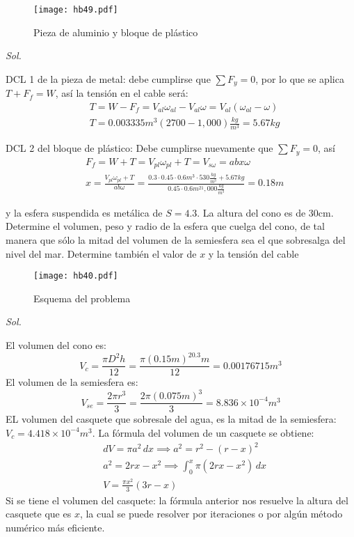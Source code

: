 \begin{figure}[h!]
\centering
  \texttt{[image: hb49.pdf]}
  \caption{Pieza de aluminio y bloque de plástico}
  \label{hb49}
\end{figure}

\textit{ Sol. }

DCL 1 de la pieza de metal: debe cumplirse que $\sum F_y=0$, por lo que se aplica $T+F_f=W$, así la tensión en el cable será:
\begin{align*}
    &T=W-F_f=V_{al}\omega_{al}-V_{al}\omega=V_{al}\left(\omega_{al}-\omega\right)\\
    &T=0.003335m^3\left(2700-1,000\right)\frac{kg}{m^3}=5.67kg
\end{align*}

DCL 2 del bloque de plástico: Debe cumplirse nuevamente que $\sum F_y=0$, así 
\begin{align*}
    &F_f=W+T=V_{pl}\omega_{pl}+T=V_{s\omega}=abx\omega\\
    &x=\frac{V_{pl}\omega_{pl}+T}{ab\omega}=\frac{0.3\cdot 0.45\cdot 0.6m^3\cdot 530\frac{kg}{m^3}+5.67kg}{0.45\cdot 0.6m^21,000\frac{kg}{m^3}}=0.18m
\end{align*}

\begin{problem}[La boya de plástico (s=0.62)]
    y la esfera suspendida es metálica de $S=4.3$. La altura del cono es de 30cm. Determine el volumen, peso y radio de la esfera que cuelga del cono, de tal manera que sólo la mitad del volumen de la semiesfera sea el que sobresalga del nivel del mar. Determine también el valor de $x$ y la tensión del cable
\end{problem}

\begin{figure}[h!]
\centering
  \texttt{[image: hb40.pdf]}
  \caption{Esquema del problema}
  \label{hb40}
\end{figure}

\textit{ Sol. }

El volumen del cono es:
\begin{equation*}
    V_c=\frac{\pi D^2h}{12}=\frac{\pi(0.15m)^20.3m}{12}=0.00176715m^3
\end{equation*}
El volumen de la semiesfera es: 
\begin{equation*}
    V_{se}=\frac{2\pi r^3}{3}=\frac{2\pi(0.075m)^3}{3}=8.836\times 10^{-4}m^3
\end{equation*}
EL volumen del casquete que sobresale del agua, es la mitad de la semiesfera: $V_c=4.418\times 10^{-4}m^3$.
La fórmula del volumen de un casquete se obtiene:
\begin{align*}
    &dV=\pi a^2\,dx\implies a^2=r^2-\left(r-x\right)^2\\
    &a^2=2rx-x^2\implies \int_0^x\pi\left(2rx-x^2\right)\,dx\\
    &V=\frac{\pi x^2}{3}\left(3r-x\right)
\end{align*}
Si se tiene el volumen del casquete: la fórmula anterior nos resuelve la altura del casquete que es $x$, la cual se puede resolver por iteraciones o por algún método numérico más eficiente.

